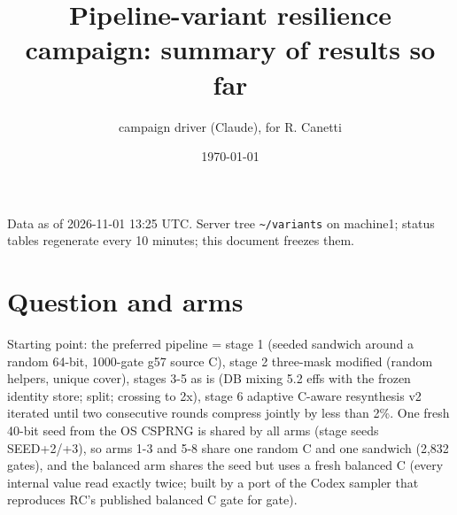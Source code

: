 \documentclass[10pt,a4paper]{article}
\begin{document}
\title{Pipeline-variant resilience campaign: summary of results so far}\author{campaign driver (Claude), for R. Canetti}\date{\today}\maketitle

Data as of 2026-11-01 13:25 UTC. Server tree \texttt{\textasciitilde{}/\allowbreak{}variants} on machine1; status tables regenerate every 10 minutes; this document freezes them.

\section{Question and arms}

Starting point: the preferred pipeline = stage 1 (seeded sandwich around a random 64-bit, 1000-gate g57 source C), stage 2 three-mask modified (random helpers, unique cover), stages 3-5 as is (DB mixing 5.2 effs with the frozen identity store; split; crossing to 2x), stage 6 adaptive C-aware resynthesis v2 iterated until two consecutive rounds compress jointly by less than 2\%. One fresh 40-bit seed from the OS CSPRNG is shared by all arms (stage seeds SEED+2/\allowbreak{}+3), so arms 1-3 and 5-8 share one random C and one sandwich (2,832 gates), and the balanced arm shares the seed but uses a fresh balanced C (every internal value read exactly twice; built by a port of the Codex sampler that reproduces RC's published balanced C gate for gate).
\end{document}
